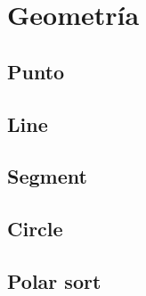 \newpage
\section{Geometr\'ia}

\subsection{Punto}


\subsection{Line}


\subsection{Segment}


\subsection{Circle}


\subsection{Polar sort}


\newpage
